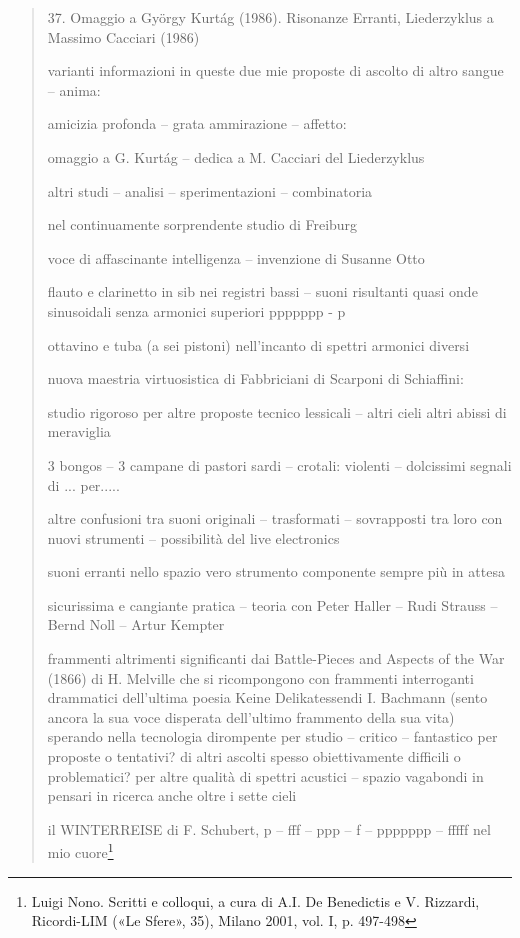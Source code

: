 \begin{quote}

37. Omaggio a György Kurtág (1986). Risonanze Erranti, Liederzyklus a Massimo Cacciari (1986)

varianti informazioni in queste due mie proposte di ascolto di altro sangue – anima:

amicizia profonda – grata ammirazione – affetto:

omaggio a G. Kurtág – dedica a M. Cacciari del Liederzyklus

altri studi – analisi – sperimentazioni – combinatoria

nel continuamente sorprendente studio di Freiburg

voce di affascinante intelligenza – invenzione di Susanne Otto

flauto e clarinetto in sib nei registri bassi – suoni risultanti quasi onde sinusoidali senza armonici superiori ppppppp - p

ottavino e tuba (a sei pistoni) nell’incanto di spettri armonici diversi

nuova maestria virtuosistica di Fabbriciani di Scarponi di Schiaffini:

studio rigoroso per altre proposte tecnico lessicali – altri cieli altri abissi di meraviglia

3 bongos – 3 campane di pastori sardi – crotali: violenti – dolcissimi segnali di ... per.....

altre confusioni tra suoni originali – trasformati – sovrapposti tra loro con nuovi strumenti – possibilità del live electronics

suoni erranti nello spazio vero strumento componente sempre più in attesa

sicurissima e cangiante pratica – teoria con Peter Haller – Rudi Strauss – Bernd Noll – Artur Kempter

frammenti altrimenti significanti dai Battle-Pieces and Aspects of the War (1866) di H. Melville che si ricompongono con frammenti interroganti drammatici dell’ultima poesia Keine Delikatessendi I. Bachmann (sento ancora la sua voce disperata dell’ultimo frammento della sua vita) sperando nella tecnologia dirompente per studio – critico – fantastico per proposte o tentativi? di altri ascolti spesso obiettivamente difficili o problematici? per altre qualità di spettri acustici – spazio vagabondi in pensari in ricerca anche oltre i sette cieli

il WINTERREISE di F. Schubert, p – fff – ppp – f – ppppppp – fffff nel mio cuore\footnote{Luigi Nono. Scritti e colloqui, a cura di A.I. De Benedictis e V. Rizzardi, Ricordi-LIM («Le Sfere», 35), Milano 2001, vol. I, p. 497-498

}
\end{quote}
